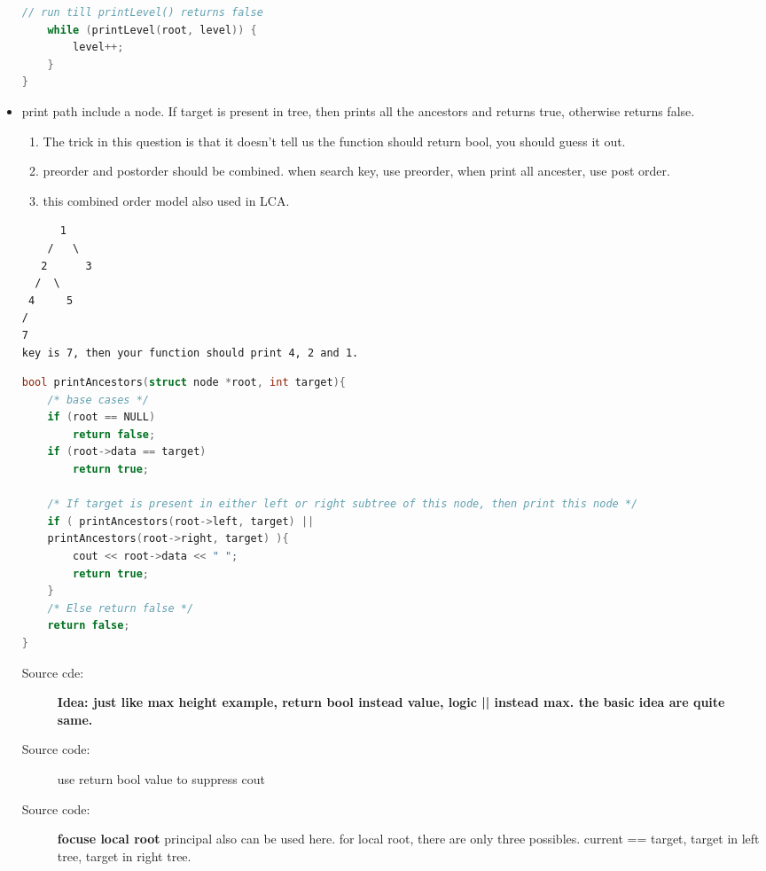 \documentclass[a4paper,11pt,twoside]{book}
\begin{document}
\begin{itemize}
\begin{lstlisting}[frame=single, language=c++]
	// run till printLevel() returns false
	while (printLevel(root, level)) {
		level++;
	}
}
\end{lstlisting}


	\item print path include a node. If target is present in tree, then prints all the ancestors and returns true, otherwise returns false. 
	
\begin{enumerate}
	\item The trick in this question is that it doesn't tell us the function should return bool, you should guess it out.
	
	\item preorder and postorder should be combined. when search key, use preorder, when print all ancester, use post order. 
	
	\item this combined order model also used in LCA.
\end{enumerate}
\begin{verbatim}
      1
    /   \
   2      3
  /  \
 4     5
/
7
key is 7, then your function should print 4, 2 and 1.
\end{verbatim}

\begin{lstlisting}[frame=single, language=c++]
bool printAncestors(struct node *root, int target){
	/* base cases */
	if (root == NULL)
		return false;
	if (root->data == target)
		return true;
	
	/* If target is present in either left or right subtree of this node, then print this node */
	if ( printAncestors(root->left, target) ||
	printAncestors(root->right, target) ){
		cout << root->data << " ";
		return true;
	}
	/* Else return false */
	return false;
}	
\end{lstlisting}
\begin{description}
	\item[Source cde:] \textbf{Idea: just like max height example, return bool instead value, logic || instead max. the basic idea are quite same. }
	
	\item[Source code:] use return bool value to suppress cout
	
	\item[Source code:] \textbf{focuse local root} principal also can be used here. for local root, there are only three possibles.  current == target,  target in left tree, target in right tree.    
\end{description}

\end{itemize}
\end{document}
